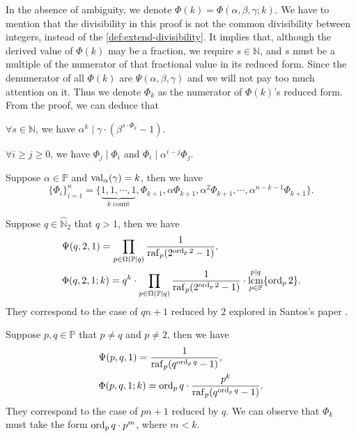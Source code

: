 In the absence of ambiguity, we denote $\Phi(k) = \Phi(\alpha, \beta, \gamma; k)$.
We have to mention that the divisibility in this proof is not the common divisibility between integers, instead of the \cref{def:extend-divisibility}. It implies that, although the derived value of $\Phi(k)$ may be a fraction, we require $s \in \mathbb{N}$, and $s$ must be a multiple of the numerator of that fractional value in its reduced form. Since the denumerator of all $\Phi(k)$ are $\Psi(\alpha,\beta,\gamma)$ and we will not pay too much attention on it.
Thus we denote $\Phi_k$ as the numerator of $\Phi(k)$'s reduced form.
From the proof, we can deduce that
\begin{corollary}\label{cor:alpha-k-mid-adjustment}
    $\forall s \in\mathbb{N}$, we have $\alpha^{k} \mid \gamma\cdot(\beta^{s\cdot\Phi_k} - 1)$.
\end{corollary}
\begin{corollary}\label{cor:alpha-times-between-Phis}
    $\forall i \ge j \ge 0$, we have $\Phi_j \mid \Phi_i$ and $\Phi_i \mid \alpha^{i-j} \Phi_j$.
\end{corollary}
\begin{example}\label{exm:sequence-of-Phi}
    Suppose $\alpha\in\mathbb{P}$ and $\operatorname{val}_{\alpha}(\gamma) = k$, then we have
    \[ \{\Phi_i\}_{i=1}^{n} = \{\underbrace{1, 1, \cdots, 1}_{k \text{ count}}, \Phi_{k+1}, \alpha\Phi_{k+1}, \alpha^{2}\Phi_{k+1}, \cdots, \alpha^{n-k-1}\Phi_{k+1}\}. \]
\end{example}
\begin{example}
    Suppose $q \in\widehat{\mathbb{N}}_{2}$ that $q > 1$, then we have \begin{align*}
        &\Psi(q, 2, 1) = \prod_{p\in\Omega(\mathbb{P}\mid q)}\frac{1}{\operatorname{raf}_{p}(2^{\operatorname{ord}_{p}2} - 1)}, \\
        &\Phi(q, 2, 1; k) = q^{k}\cdot\prod_{p\in\Omega(\mathbb{P}\mid q)}\frac{1}{\operatorname{raf}_{p}(2^{\operatorname{ord}_{p}2} - 1)} \cdot \operatorname*{lcm}_{p\in\mathbb{P}}^{p\mid q}\{\operatorname{ord}_{p}2\}.
    \end{align*}
    They correspond to the case of $qn+1$ reduced by $2$ explored in Santos's paper \cite{santos2021collatzgeneralproblemqn1}.
\end{example}
\begin{example}
    Suppose $p, q \in \mathbb{P}$ that $p\ne q$ and $p\ne 2$, then we have \begin{align*}
        &\Psi(p, q, 1) = \frac{1}{\operatorname{raf}_{p}(q^{\operatorname{ord}_{p}q} - 1)}, \\
        &\Phi(p, q, 1; k) = \operatorname{ord}_{p}q \cdot \frac{p^{k}}{\operatorname{raf}_{p}(q^{\operatorname{ord}_{p}q} - 1)}.
    \end{align*}
    They correspond to the case of $pn+1$ reduced by $q$. We can observe that $\Phi_k$ must take the form $\operatorname{ord}_{p}q \cdot p^{m}$, where $m < k$.
\end{example}
